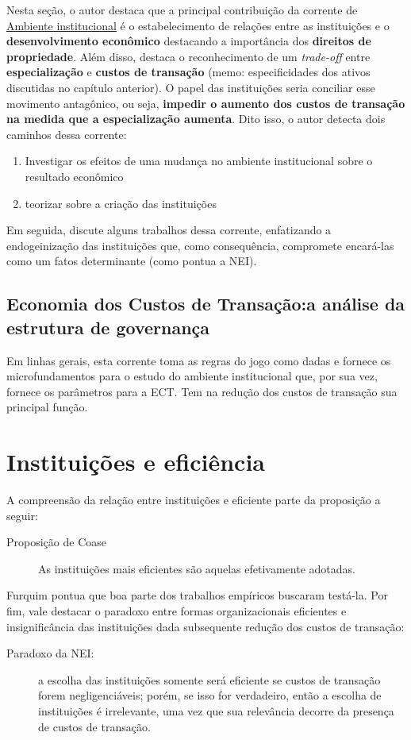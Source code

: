 \documentclass[9pt,twocolumn,twoside,lineno]{style}
\begin{document}
Nesta seção, o autor destaca que a principal contribuição da corrente de \underline{Ambiente institucional} é o estabelecimento de relações entre as instituições e o \textbf{desenvolvimento econômico} destacando a importância dos \textbf{direitos de propriedade}. Além disso, destaca o reconhecimento de um \textit{trade-off} entre \textbf{especialização} e \textbf{custos de transação} (memo: especificidades dos ativos discutidas no capítulo anterior). O papel das instituições seria conciliar esse movimento antagônico, ou seja, \textbf{impedir o aumento dos custos de transação na medida que a especialização aumenta}. Dito isso, o autor detecta dois caminhos dessa corrente:
\begin{enumerate}
	\item Investigar os efeitos de uma mudança no ambiente institucional sobre o resultado econômico
	 \item teorizar sobre a criação das instituições
\end{enumerate}
Em seguida, discute alguns trabalhos dessa corrente, enfatizando a endogeinização das instituições que, como consequência, compromete encará-las como um fatos determinante (como pontua a NEI).

\subsection{Economia dos Custos de Transação:a análise da estrutura de governança}

Em linhas gerais, esta corrente toma as regras do jogo como dadas e fornece os microfundamentos para o estudo do ambiente institucional que, por sua vez, fornece os parâmetros para a ECT. Tem na redução dos custos de transação sua principal função.

\section{Instituições e eficiência}

A compreensão da relação entre instituições e eficiente parte da proposição a seguir:

\begin{description}
	\item[Proposição de Coase] As instituições mais eficientes são aquelas efetivamente adotadas.
\end{description}
Furquim pontua que boa parte dos trabalhos empíricos buscaram testá-la. Por fim, vale destacar o paradoxo entre formas organizacionais eficientes e insignificância das instituições dada subsequente redução dos custos de transação:
\begin{description}
	\item[Paradoxo da NEI:] a escolha das instituições somente será eficiente
	se custos de transação forem negligenciáveis; porém, se isso for verdadeiro, então a escolha de instituições é irrelevante, uma vez
	que sua relevância decorre da presença de custos de transação.  
\end{description}
	
\end{document}

